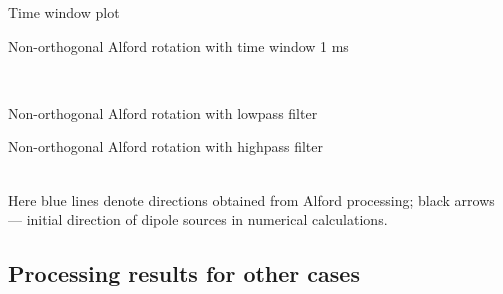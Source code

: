 \documentclass[a4paper,11pt]{article}
\begin{document}
\begin{minipage}[c]{0.47\linewidth}
\begin{center}
		Time window plot\\
		
\end{center}
\end{minipage}	
\begin{minipage}[c]{0.47\linewidth}
\begin{center}
		Non-orthogonal Alford rotation with time window 1 ms\\
		
\end{center}
\end{minipage} \hfill	 \\
\begin{minipage}[c]{0.47\linewidth}	
\begin{center}
		Non-orthogonal Alford rotation with lowpass filter\\
	  		\label{fig:rot4_gs_lp_scheme}
\end{center}	  		
\end{minipage}
\begin{minipage}[c]{0.47\linewidth}
\begin{center}
		Non-orthogonal Alford rotation with highpass filter\\
			\label{fig:rot4_gs_hp_scheme}
\end{center}
\end{minipage} \\

\footnotesize Here blue lines denote directions obtained from Alford processing; black arrows --- initial direction of dipole sources in numerical calculations.
\normalsize

\vspace{\baselineskip}
\vspace{\baselineskip}

\subsection*{Processing results for other cases}
\end{document}
